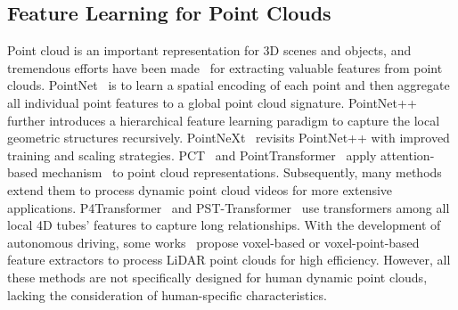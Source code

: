 \subsection{Feature Learning for Point Clouds}
Point cloud is an important representation for 3D scenes and objects, and tremendous efforts have been made~\cite{ma2022rethinking,qian2022pointnext} for extracting valuable features from point clouds. PointNet~\cite{qi2017pointnet} is to learn a spatial encoding of each point and then aggregate all individual point features to a global point cloud signature\cite{qi2017pointnet++}.
PointNet++\cite{qi2017pointnet++} further introduces a hierarchical feature learning paradigm to capture the local geometric structures recursively. 
PointNeXt~\cite{qian2022pointnext} revisits PointNet++\cite{qi2017pointnet++} with improved
training and scaling strategies.
PCT~\cite{guo2021pct} and PointTransformer~\cite{zhao2021point} apply attention-based mechanism~\cite{vaswani2017attention} to point cloud representations.
Subsequently, many methods~\cite{choy20194d,liu2019meteornet,choy20194d,fan2022pstnet} extend them to process dynamic point cloud videos for more extensive applications.  
P4Transformer~\cite{fan2021point} and PST-Transformer~\cite{fan2022point} use transformers among all local 4D tubes' features to capture long relationships. With the development of autonomous driving, some works~\cite{voxelnet,zhu2021cylindrical,centerformer,centerpoint} propose voxel-based or voxel-point-based feature extractors to process LiDAR point clouds for high efficiency.
However, all these methods are not specifically designed for human dynamic point clouds, lacking the consideration of human-specific characteristics. 

